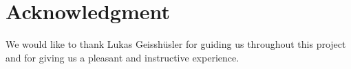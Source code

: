 
\section{Acknowledgment}
We would like to thank Lukas Geisshüsler for guiding us throughout this project and for giving us a pleasant and instructive experience.
